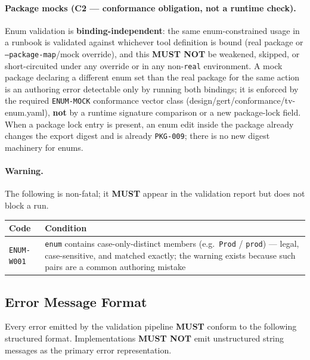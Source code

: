 \paragraph{Package mocks (C2 --- conformance obligation, not a runtime
check).} Enum validation is \textbf{binding-independent}: the same
enum-constrained usage in a runbook is validated against whichever tool
definition is bound (real package or \texttt{--package-map}/mock
override), and this \textbf{MUST NOT} be weakened, skipped, or
short-circuited under any override or in any non-\texttt{real} environment.
A mock package declaring a different enum set than the real package for
the same action is an authoring error detectable only by running both
bindings; it is enforced by the required \texttt{ENUM-MOCK} conformance
vector class (design/gert/conformance/tv-enum.yaml), \textbf{not} by a
runtime signature comparison or a new package-lock field. When a package
lock entry is present, an enum edit inside the package already changes the
export digest and is already \texttt{PKG-009}; there is no new digest
machinery for enums.

\paragraph{Warning.} The following is non-fatal; it \textbf{MUST} appear in
the validation report but does not block a run.

\begin{center}\small
\begin{tabular}{p{2.8cm}p{10.5cm}}
\hline
\textbf{Code} & \textbf{Condition} \\
\hline
\texttt{ENUM-W001} & \texttt{enum} contains case-only-distinct members (e.g.\ \texttt{Prod} / \texttt{prod}) --- legal, case-sensitive, and matched exactly; the warning exists because such pairs are a common authoring mistake \\
\hline
\end{tabular}
\end{center}

\subsection{Error Message Format}
\label{sec:parse-gate:error-format}

Every error emitted by the validation pipeline \textbf{MUST} conform to the
following structured format.  Implementations \textbf{MUST NOT} emit
unstructured string messages as the primary error representation.

